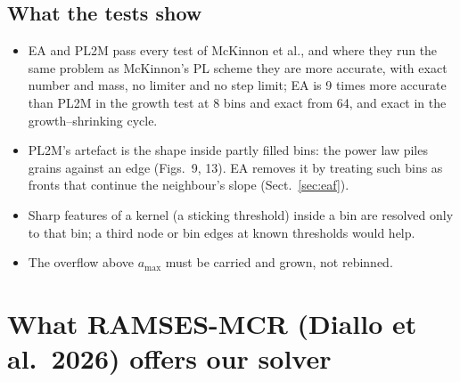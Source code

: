 \documentclass[11pt,a4paper]{article}
\begin{document}
\subsection{What the tests show}
\begin{itemize}
\item EA and PL2M pass every test of McKinnon et al., and where they run the same problem as McKinnon's PL scheme
  they are more accurate, with exact number and mass, no limiter and no step limit; EA is 9 times more accurate than
  PL2M in the growth test at 8 bins and exact from 64, and exact in the growth--shrinking cycle.
\item PL2M's artefact is the shape inside partly filled bins: the power law piles grains against an edge (Figs.~9, 13).
  EA removes it by treating such bins as fronts that continue the neighbour's slope (Sect.~\ref{sec:eaf}).
\item Sharp features of a kernel (a sticking threshold) inside a bin are resolved only to that bin; a third node or
  bin edges at known thresholds would help.
\item The overflow above $a_{\max}$ must be carried and grown, not rebinned.
\end{itemize}

\section{What RAMSES-MCR (Diallo et al.\ 2026) offers our solver}\label{sec:diallo}
\end{document}
